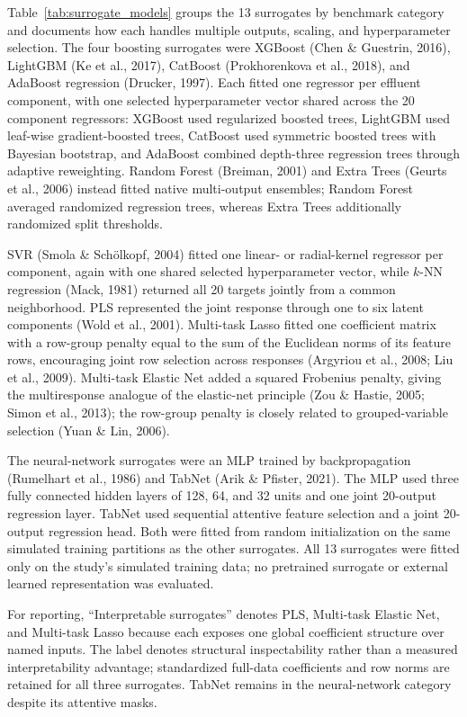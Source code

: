 \documentclass[a4paper,fleqn]{cas-sc}
\begin{document}
Table~\ref{tab:surrogate_models} groups the 13 surrogates by benchmark category and documents how each handles multiple outputs, scaling, and hyperparameter selection. The four boosting surrogates were XGBoost (Chen \& Guestrin, 2016), LightGBM (Ke et al., 2017), CatBoost (Prokhorenkova et al., 2018), and AdaBoost regression (Drucker, 1997). Each fitted one regressor per effluent component, with one selected hyperparameter vector shared across the 20 component regressors: XGBoost used regularized boosted trees, LightGBM used leaf-wise gradient-boosted trees, CatBoost used symmetric boosted trees with Bayesian bootstrap, and AdaBoost combined depth-three regression trees through adaptive reweighting. Random Forest (Breiman, 2001) and Extra Trees (Geurts et al., 2006) instead fitted native multi-output ensembles; Random Forest averaged randomized regression trees, whereas Extra Trees additionally randomized split thresholds.

SVR (Smola \& Sch\"olkopf, 2004) fitted one linear- or radial-kernel regressor per component, again with one shared selected hyperparameter vector, while $k$-NN regression (Mack, 1981) returned all 20 targets jointly from a common neighborhood. PLS represented the joint response through one to six latent components (Wold et al., 2001). Multi-task Lasso fitted one coefficient matrix with a row-group penalty equal to the sum of the Euclidean norms of its feature rows, encouraging joint row selection across responses (Argyriou et al., 2008; Liu et al., 2009). Multi-task Elastic Net added a squared Frobenius penalty, giving the multiresponse analogue of the elastic-net principle (Zou \& Hastie, 2005; Simon et al., 2013); the row-group penalty is closely related to grouped-variable selection (Yuan \& Lin, 2006).

The neural-network surrogates were an MLP trained by backpropagation (Rumelhart et al., 1986) and TabNet (Arik \& Pfister, 2021). The MLP used three fully connected hidden layers of 128, 64, and 32 units and one joint 20-output regression layer. TabNet used sequential attentive feature selection and a joint 20-output regression head. Both were fitted from random initialization on the same simulated training partitions as the other surrogates. All 13 surrogates were fitted only on the study's simulated training data; no pretrained surrogate or external learned representation was evaluated.

For reporting, ``Interpretable surrogates'' denotes PLS, Multi-task Elastic Net, and Multi-task Lasso because each exposes one global coefficient structure over named inputs. The label denotes structural inspectability rather than a measured interpretability advantage; standardized full-data coefficients and row norms are retained for all three surrogates. TabNet remains in the neural-network category despite its attentive masks.
\end{document}
